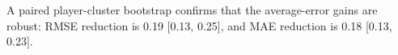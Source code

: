 A paired player-cluster bootstrap confirms that the average-error gains are robust: RMSE reduction is 0.19 [0.13, 0.25], and MAE reduction is 0.18 [0.13, 0.23].
